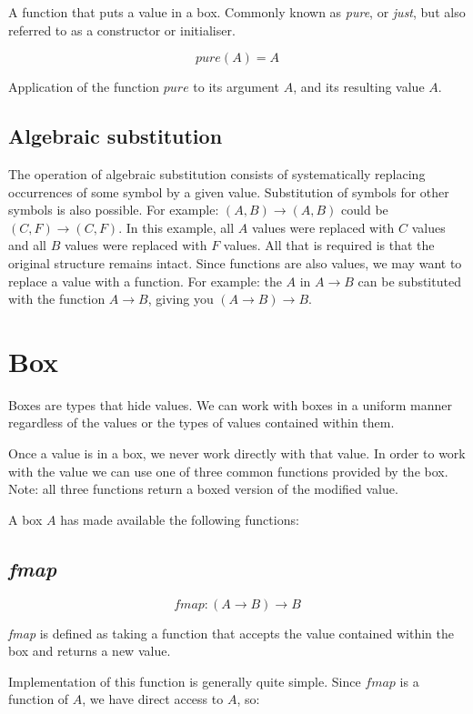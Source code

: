 \documentclass{shpdocumentation}
\begin{document}
A function that puts a value in a box.  Commonly known as \textit{pure}, or \textit{just}, but also referred to as a constructor or initialiser.

\[ pure(A) = \boxed{A} \]

Application of the function $pure$ to its argument $A$, and its resulting value $\boxed{A}$.


\subsection{Algebraic substitution}

The operation of algebraic substitution consists of systematically replacing occurrences of some symbol by a given value.  Substitution of symbols for other symbols is also possible.  For example: $(A, B) \to \boxed{(A, B)}$ could be $(C, F) \to \boxed{(C, F)}$.  In this example, all $A$ values were replaced with $C$ values and all $B$ values were replaced with $F$ values. All that is required is that the original structure remains intact.  Since functions are also values, we may want to replace a value with a function.  For example: the $A$ in $A \to B$ can be substituted with the function $A \to B$, giving you $(A \to B) \to B$.

\section{Box}

Boxes are types that hide values.  We can work with boxes in a uniform manner regardless of the values or the types of values contained within them.

Once a value is in a box, we never work directly with that value. In order to work with the value we can use one of three common functions provided by the box.  Note: all three functions return a boxed version of the modified value.

A box $ \boxed{A} $ has made available the following functions:

\subsection{\textit{fmap}}

\[ fmap\colon (A \to B) \to \boxed{B} \]

\textit{fmap} is defined as taking a function that accepts the value contained within the box and returns a new value.

Implementation of this function is generally quite simple.  Since $fmap$ is a function of $\boxed{A}$, we have direct access to $A$, so:
\end{document}
